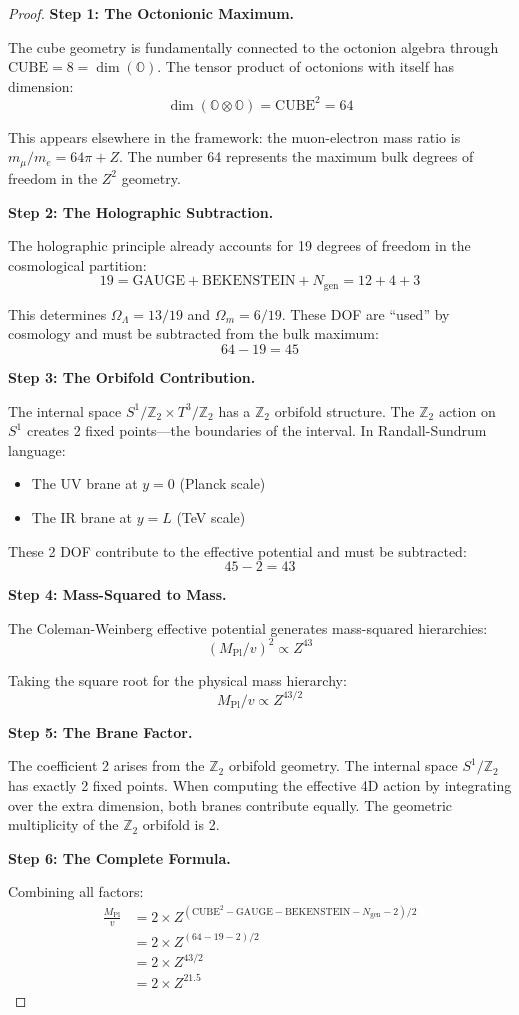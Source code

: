 \documentclass[11pt,a4paper]{article}
\theoremstyle{plain}
\theoremstyle{definition}
\theoremstyle{remark}
\newcommand{\Mpl}{M_{\text{Pl}}}
\newcommand{\Ngen}{N_{\text{gen}}}
\newcommand{\Omegam}{\Omega_m}
\newcommand{\OmegaL}{\Omega_\Lambda}
\newcommand{\Ztwo}{\mathbb{Z}_2}
\newcommand{\CUBE}{\text{CUBE}}
\newcommand{\GAUGE}{\text{GAUGE}}
\newcommand{\BEK}{\text{BEKENSTEIN}}
\begin{document}
\begin{proof}
\textbf{Step 1: The Octonionic Maximum.}

The cube geometry is fundamentally connected to the octonion algebra through $\CUBE = 8 = \dim(\mathbb{O})$. The tensor product of octonions with itself has dimension:
\[
\dim(\mathbb{O} \otimes \mathbb{O}) = \CUBE^2 = 64
\]

This appears elsewhere in the framework: the muon-electron mass ratio is $m_\mu/m_e = 64\pi + Z$. The number 64 represents the maximum bulk degrees of freedom in the $Z^2$ geometry.

\textbf{Step 2: The Holographic Subtraction.}

The holographic principle already accounts for 19 degrees of freedom in the cosmological partition:
\[
19 = \GAUGE + \BEK + \Ngen = 12 + 4 + 3
\]

This determines $\OmegaL = 13/19$ and $\Omegam = 6/19$. These DOF are ``used'' by cosmology and must be subtracted from the bulk maximum:
\[
64 - 19 = 45
\]

\textbf{Step 3: The Orbifold Contribution.}

The internal space $S^1/\Ztwo \times T^3/\Ztwo$ has a $\Ztwo$ orbifold structure. The $\Ztwo$ action on $S^1$ creates 2 fixed points---the boundaries of the interval. In Randall-Sundrum language:
\begin{itemize}
  \item The UV brane at $y = 0$ (Planck scale)
  \item The IR brane at $y = L$ (TeV scale)
\end{itemize}

These 2 DOF contribute to the effective potential and must be subtracted:
\[
45 - 2 = 43
\]

\textbf{Step 4: Mass-Squared to Mass.}

The Coleman-Weinberg effective potential generates mass-squared hierarchies:
\[
(\Mpl/v)^2 \propto Z^{43}
\]

Taking the square root for the physical mass hierarchy:
\[
\Mpl/v \propto Z^{43/2}
\]

\textbf{Step 5: The Brane Factor.}

The coefficient 2 arises from the $\Ztwo$ orbifold geometry. The internal space $S^1/\Ztwo$ has exactly 2 fixed points. When computing the effective 4D action by integrating over the extra dimension, both branes contribute equally. The geometric multiplicity of the $\Ztwo$ orbifold is 2.

\textbf{Step 6: The Complete Formula.}

Combining all factors:
\begin{align}
\frac{\Mpl}{v} &= 2 \times Z^{(\CUBE^2 - \GAUGE - \BEK - \Ngen - 2)/2} \nonumber \\
               &= 2 \times Z^{(64 - 19 - 2)/2} \nonumber \\
               &= 2 \times Z^{43/2} \nonumber \\
               &= 2 \times Z^{21.5}
\end{align}
\end{proof}
\end{document}
